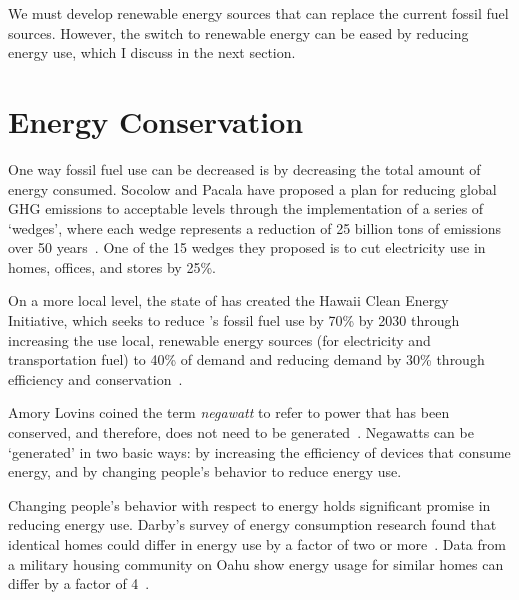 We must develop renewable energy sources that can replace the current fossil fuel sources. However, the switch to renewable energy can be eased by reducing energy use, which I discuss in the next section.


\section{Energy Conservation}

One way fossil fuel use can be decreased is by decreasing the total amount of energy consumed. Socolow and Pacala have proposed a plan for reducing global GHG emissions to acceptable levels through the implementation of a series of `wedges', where each wedge represents a reduction of 25 billion tons of \COtwo emissions over 50 years~\cite{Socolow2008}. One of the 15 wedges they proposed is to cut electricity use in homes, offices, and stores by 25\%.

On a more local level, the state of \Hawaii has created the Hawaii Clean Energy Initiative, which seeks to reduce \Hawaii's fossil fuel use by 70\% by 2030 through increasing the use local, renewable energy sources (for electricity and transportation fuel) to 40\% of demand and reducing demand by 30\% through efficiency and conservation~\cite{HCEI-website}.

Amory Lovins coined the term \emph{negawatt} to refer to power that has been conserved, and therefore, does not need to be generated~\cite{Kolbert2007Mr-Green}. Negawatts can be `generated' in two basic ways: by increasing the efficiency of devices that consume energy, and by changing people's behavior to reduce energy use.

Changing people's behavior with respect to energy holds significant promise in reducing energy use. Darby's survey of energy consumption research found that identical homes could differ in energy use by a factor of two or more~\cite{darby-review-2006}. Data from a military housing community on Oahu show energy usage for similar homes can differ by a factor of 4~\cite{Norton2010ZeroEnergyHomes}.



